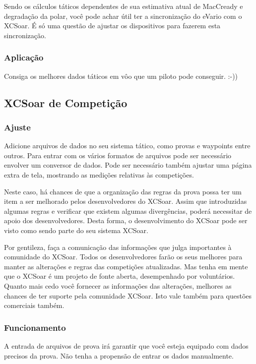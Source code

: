 Sendo os cálculos táticos dependentes de sua estimativa atual de MacCready e degradação da polar, você pode achar útil ter a sincronização do eVario com o XCSoar.  É só uma questão de ajustar os dispositivos para fazerem esta sincronização.


\subsubsection*{Aplicação} Consiga os melhores dados táticos em vôo que um piloto pode conseguir. :-))

\subsection*{XCSoar de Competição}
\subsubsection*{Ajuste} Adicione arquivos de dados no seu sistema tático, como provas e waypoints entre outros.  Para entrar com os vários formatos de arquivos pode ser necessário envolver um conversor de dados.  Pode ser necessário também ajustar uma página extra de tela, mostrando as medições relativas às competições.

Neste caso, há chances de que a organização das regras da prova possa ter um item a ser melhorado pelos desenvolvedores do XCSoar.  Assim que introduzidas algumas regras e verificar que existem algumas divergências, poderá necessitar de apoio dos desenvolvedores.  Desta forma, o desenvolvimento do XCSoar pode ser visto como sendo parte do seu sistema XCSoar.

Por gentileza, faça a comunicação das informações que julga importantes à comunidade do XCSoar.  Todos os desenvolvedores farão os seus melhores para manter as alterações e regras das competições atualizadas.  Mas tenha em mente que o XCSoar é um projeto de fonte aberta, desempenhado por voluntários.  Quanto mais cedo você fornecer as informações das alterações, melhores as chances de ter suporte pela comunidade XCSoar.  Isto vale também para questões comerciais também.  


\subsubsection*{Funcionamento} A entrada de arquivos de prova irá garantir que você esteja equipado com dados precisos da prova. Não tenha a propensão de entrar os dados manualmente.
 
